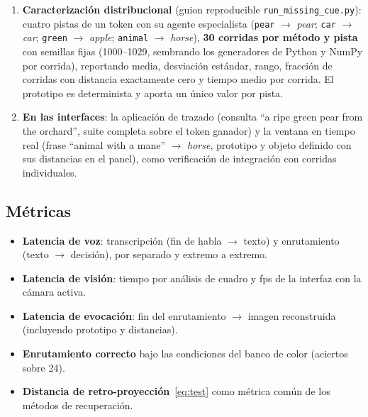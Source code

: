 \begin{enumerate}
    \item \textbf{Caracterización distribucional} (guion reproducible
    \texttt{run\_missing\_cue.py}): cuatro pistas de un token con su agente
    especialista (\texttt{pear} $\to$ \textit{pear}; \texttt{car} $\to$ \textit{car};
    \texttt{green} $\to$ \textit{apple}; \texttt{animal} $\to$ \textit{horse}),
    \textbf{30 corridas por método y pista} con semillas fijas (1000--1029, sembrando
    los generadores de Python y NumPy por corrida), reportando media, desviación
    estándar, rango, fracción de corridas con distancia exactamente cero y tiempo
    medio por corrida.
    El prototipo es determinista y aporta un único valor por pista.

    \item \textbf{En las interfaces}: la aplicación de trazado (consulta
    ``a ripe green pear from the orchard'', suite completa sobre el token ganador) y
    la ventana en tiempo real (frase ``animal with a mane'' $\to$ \textit{horse},
    prototipo y objeto definido con sus distancias en el panel), como verificación de
    integración con corridas individuales.
\end{enumerate}

\subsection{Métricas}

\begin{itemize}
    \item \textbf{Latencia de voz}: transcripción (fin de habla $\to$ texto) y
    enrutamiento (texto $\to$ decisión), por separado y extremo a extremo.
    \item \textbf{Latencia de visión}: tiempo por análisis de cuadro y fps de la
    interfaz con la cámara activa.
    \item \textbf{Latencia de evocación}: fin del enrutamiento $\to$ imagen
    reconstruida (incluyendo prototipo y distancias).
    \item \textbf{Enrutamiento correcto} bajo las condiciones del banco de color
    (aciertos sobre 24).
    \item \textbf{Distancia de retro-proyección}~\eqref{eq:test} como métrica común de
    los métodos de recuperación.
\end{itemize}
